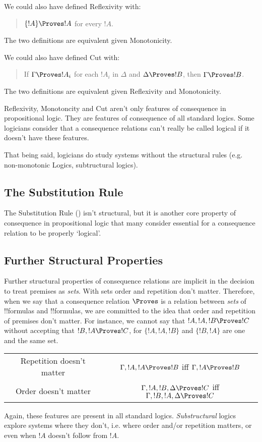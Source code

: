 \documentclass[../../../include/open-logic-section]{subfiles}
\begin{document}
\begin{explain}
We could also have defined Reflexivity with:
\begin{quote}
    $\{!A\}\Proves !A$ for every $!A$. 
\end{quote}
The two definitions are equivalent given Monotonicity. 

We could also have defined Cut with: 
\begin{quote}
    If $\Gamma\Proves !A_i$ for each $!A_i$ in $\Delta$ and $\Delta\Proves !B$,
    then $\Gamma\Proves !B$. 
\end{quote}
The two definitions are equivalent given Reflexivity and Monotonicity.
\end{explain}

Reflexivity, Monotoncity and Cut aren't only features of consequence in
propositional logic. They are features of consequence of all standard
logics. Some logicians consider that a consequence relations can't
really be called logical if it doesn't have these features.

That being said, logicians do study systems without the structural 
rules (e.g. non-monotonic Logics, subtructural logics).

\subsection{The Substitution Rule}

The Substitution Rule () 
isn't structural, but it is another core property
of consequence in propositional logic that many consider essential 
for a consequence relation to be properly `logical'.

\subsection{Further Structural Properties}

Further structural properties of consequence relations are implicit in
the decision to treat premises as \emph{sets}. With sets order and
repetition don't matter. Therefore, when we say that a consequence
relation $\Proves$ is a relation between \emph{sets} of !!{formula}s
and !!{formula}s, we are committed to the idea that order and
repetition of premises don't matter. For instance, we cannot say that
$!A,!A,!B\Proves !C$ without accepting that $!B,!A\Proves !C$, for
$\{!A,!A,!B\}$ and $\{!B,!A\}$ are one and the same set. 

\smallskip\noindent
\begin{tabular}{cc}
    Repetition doesn't matter 
        & $\Gamma,!A,!A\Proves!B$ iff $\Gamma,!A\Proves!B$ \\
    Order doesn't matter
        & $\Gamma,!A,!B,\Delta\Proves!C$ iff $\Gamma,!B,!A,\Delta\Proves!C$\\
\end{tabular}

Again, these features are present in all standard logics.
\emph{Substructural} logics explore systems where they don't, i.e. 
where order and/or repetition matters, or even when $!A$ doesn't 
follow from $!A$. 
\end{document}
